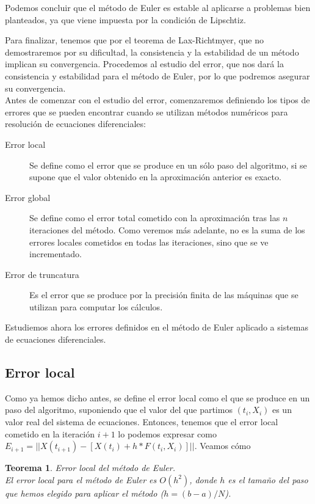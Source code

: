 \documentclass[12pt]{article}       %
\newtheorem{theorem}{Teorema}
\begin{document}
Podemos concluir que el método de Euler es estable al aplicarse a problemas bien planteados, ya que viene impuesta por la condición de Lipschtiz.

Para finalizar, tenemos que por el teorema de Lax-Richtmyer, que no demostraremos por su dificultad, la consistencia y la estabilidad de un método implican su convergencia. Procedemos al estudio del error, que nos dará la consistencia y estabilidad para el método de Euler, por lo que podremos asegurar su convergencia.\\

Antes de comenzar con el estudio del error, comenzaremos definiendo los tipos de errores que se pueden encontrar cuando se utilizan métodos numéricos para resolución de ecuaciones diferenciales:

\begin{description}
\item[Error local] Se define como el error que se produce en un sólo paso del algoritmo, si se supone que el valor obtenido en la aproximación anterior es exacto.
\item[Error global] Se define como el error total cometido con la aproximación tras las $n$ iteraciones del método. Como veremos más adelante, no es la suma de los errores locales cometidos en todas las iteraciones, sino que se ve incrementado.
\item[Error de truncatura] Es el error que se produce por la precisión finita de las máquinas que se utilizan para computar los cálculos.
\end{description}

Estudiemos ahora los errores definidos en el método de Euler aplicado a sistemas de ecuaciones diferenciales.

\subsection{Error local}

Como ya hemos dicho antes, se define el error local como el que se produce en un paso del algoritmo, suponiendo que el valor del que partimos $(t_i, X_i)$ es un valor real del sistema de ecuaciones. Entonces, tenemos que el error local cometido en la iteración $i+1$ lo podemos expresar como $E_{i+1} = ||X(t_{i+1}) - [X(t_{i}) + h*F(t_i, X_i)] ||$. Veamos cómo 

\begin{theorem} Error local del método de Euler.\\

El error local para el método de Euler es $O(h^2)$, donde $h$ es el tamaño del paso que hemos elegido para aplicar el método ($h=(b-a)/N$).

\end{theorem}
\end{document}
